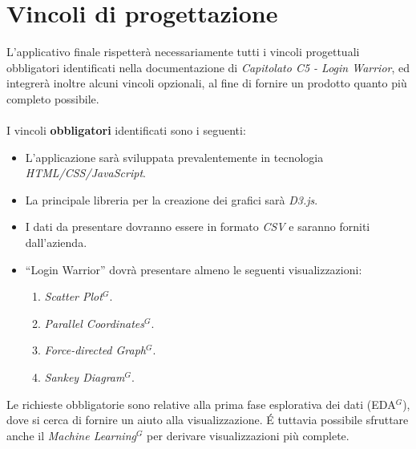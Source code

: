 \section{Vincoli di progettazione}

L'applicativo finale rispetterà necessariamente tutti i vincoli progettuali obbligatori identificati nella documentazione di \textit{Capitolato C5 - Login Warrior}, ed integrerà inoltre alcuni vincoli opzionali, al fine di fornire un prodotto quanto più completo possibile. \\ \\
I vincoli \textbf{obbligatori} identificati sono i seguenti:
\begin{itemize}
	\item L’applicazione sarà sviluppata prevalentemente in tecnologia \textit{HTML/CSS/JavaScript}.
	\item La principale libreria per la creazione dei grafici sarà \textit{D3.js}.
	\item I dati da presentare dovranno essere in formato \textit{CSV} e saranno forniti 
			dall'azienda.
	\item “Login Warrior” dovrà presentare almeno le seguenti visualizzazioni:
		 \begin{enumerate}
                    \item \textit{Scatter Plot$^{G}$}.
                    \item \textit{Parallel Coordinates$^{G}$}.
                    \item \textit{Force-directed Graph$^{G}$}.
                    \item \textit{Sankey Diagram$^{G}$}.
		\end{enumerate}
\end{itemize}

\noindent
Le richieste obbligatorie sono relative alla prima fase esplorativa dei dati (EDA$^{G}$), dove si cerca di fornire un aiuto alla visualizzazione. \' E tuttavia possibile sfruttare anche il \textit{Machine Learning$^{G}$} per derivare visualizzazioni più complete.

